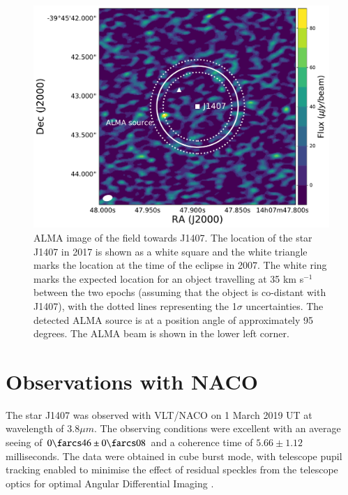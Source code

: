 \documentclass[twocolumn]{aa} %
\newcommand{\kms}{km s$^{-1}$}
\begin{document}
\begin{figure}[tbh]
\begin{center}
\includegraphics[width=\columnwidth]{j1407_alma_gaia_astrometry_plot}
\caption{\label{fig:alma}ALMA image of the field towards J1407. The location of the star J1407 in 2017 is shown as a white square and the white triangle marks the location at the time of the eclipse in 2007. The white ring marks the expected location for an object travelling at 35 \kms{} between the two epochs (assuming that the object is co-distant with J1407), with the dotted lines representing the 1$\sigma$ uncertainties. The detected ALMA source is at a position angle of approximately 95 degrees. The ALMA beam is shown in the lower left corner.}
\end{center}
\end{figure}

\section{Observations with NACO\label{naco}} %

The star J1407 was observed with VLT/NACO \citep{Lenzen03,Rousset03} on 1 March 2019 UT at wavelength of $3.8\mu m$.
%
The observing conditions were excellent with an average seeing of $0\farcs46\pm0\farcs08$ and a coherence time of $5.66\pm1.12$ milliseconds.
%
The data were obtained in cube burst mode, with telescope pupil tracking \citep{Kasper09} enabled to minimise the effect of residual speckles from the telescope optics for optimal Angular Differential Imaging \citep[ADI;][]{Marois06}.
\end{document}
